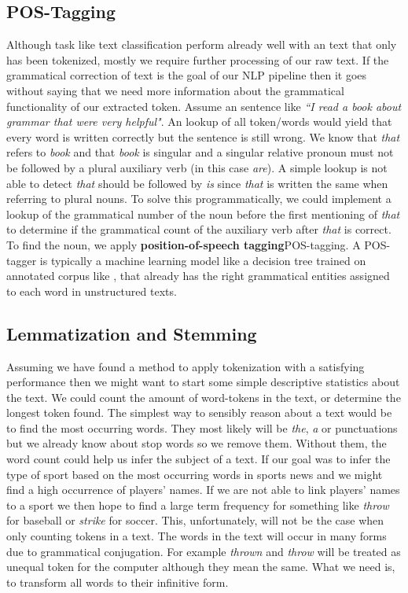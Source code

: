 \subsection{POS-Tagging}
Although task like text classification perform already well with an text that only has been tokenized, mostly we require further processing of our raw text. If the grammatical correction of text is the goal of our NLP pipeline then it goes without saying that we need more information about the grammatical functionality of our extracted token. Assume an sentence like \textit{``I read a book about grammar that were very helpful"}. An lookup of all token/words would yield that every word is written correctly but the sentence is still wrong. We know that \textit{that} refers to \textit{book} and that \textit{book} is singular and a singular relative pronoun must not be followed by a plural auxiliary verb (in this case \textit{are}). A simple lookup is not able to detect \textit{that} should be followed by \textit{is} since \textit{that} is written the same when referring to plural nouns. To solve this programmatically, we could implement a lookup of the grammatical number of the noun before the first mentioning of \textit{that} to determine if the grammatical count of the auxiliary verb after \textit{that} is correct. To find the noun, we apply \textbf{position-of-speech tagging}\gls{POS-tagging}. A POS-tagger is typically a machine learning model like a decision tree \citep{Marquez98} trained on annotated corpus like \citep{PennTreebank}, that already has the right grammatical entities assigned to each word in unstructured texts.

\subsection{Lemmatization and Stemming}
Assuming we have found a method to apply tokenization with a satisfying performance then we might want to start some simple descriptive statistics about the text. We could count the amount of word-tokens in the text, or determine the longest token found. The simplest way to sensibly reason about a text would be to find the most occurring words. They most likely will be \textit{the}, \textit{a} or punctuations but we already know about stop words so we remove them. Without them, the word count could help us infer the subject of a text. If our goal was to infer the type of sport based on the most occurring words in sports news and we might find a high occurrence of players' names. If we are not able to link players' names to a sport we then hope to find a large term frequency for something like \textit{throw} for baseball or \textit{strike} for soccer. This, unfortunately, will not be the case when only counting tokens in a text. The words in the text will occur in many forms due to grammatical conjugation. For example \textit{thrown} and \textit{throw} will be treated as unequal token for the computer although they mean the same. What we need is, to transform all words to their infinitive form.

